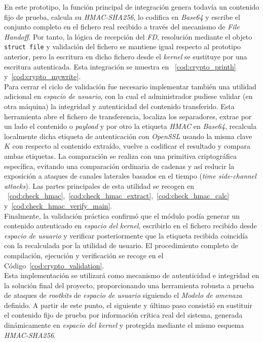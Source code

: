 En este prototipo, la función principal de integración genera todavía un contenido fijo de prueba, calcula su \textit{HMAC-SHA256}, lo codifica en \textit{Base64} y escribe el conjunto completo en el fichero real recibido a través del mecanismo de \textit{File Handoff}.
Por tanto, la lógica de recepción del \textit{FD}, resolución mediante el objeto \texttt{struct file} y validación del fichero se mantiene igual respecto al prototipo anterior, pero la escritura en dicho fichero desde el \textit{kernel} se sustituye por una escritura autenticada.
Esta integración se muestra en ~\ref{cod:crypto_printh} y~\ref{cod:crypto_mywrite}.\\

Para cerrar el ciclo de validación fue necesario implementar también una utilidad adicional en \textit{espacio de usuario}, con la cual el administrador pudiese validar (en otra máquina) la integridad y autenticidad del contenido transferido.
Esta herramienta abre el fichero de transferencia, localiza los separadores, extrae por un lado el contenido o \textit{payload} y por otro la etiqueta \textit{HMAC} en \textit{Base64}, recalcula localmente dicha etiqueta de autenticación con \textit{OpenSSL} usando la misma clave \(K\) con respecto al contenido extraído, vuelve a codificar el resultado y compara ambas etiquetas.
La comparación se realiza con una primitiva criptográfica específica, evitando una comparación ordinaria de cadenas y así reducir la exposición a ataques de canales laterales basados en el tiempo (\textit{time side-channel attacks}).
Las partes principales de esta utilidad se recogen en ~\ref{cod:check_hmac},~\ref{cod:check_hmac_extract},~\ref{cod:check_hmac_calc} y~\ref{cod:check_hmac_verify_main}.\\

Finalmente, la validación práctica confirmó que el módulo podía generar un contenido autenticado en \textit{espacio del kernel}, escribirlo en el fichero recibido desde \textit{espacio de usuario} y verificar posteriormente que la etiqueta recibida coincidía con la recalculada por la utilidad de usuario.
El procedimiento completo de compilación, ejecución y verificación se recoge en el Código~\ref{cod:crypto_validation}.\\

Esta implementación se utilizará como mecanismo de autenticidad e integridad en la solución final del proyecto, proporcionando una herramienta robusta a prueba de ataques de \textit{rootkits} de \textit{espacio de usuario} siguiendo el \textit{Modelo de amenaza} definido.
A partir de este punto, el siguiente y último paso consistió en sustituir el contenido fijo de prueba por información crítica real del sistema, generada dinámicamente en \textit{espacio del kernel} y protegida mediante el mismo esquema \textit{HMAC-SHA256}.\\\\

